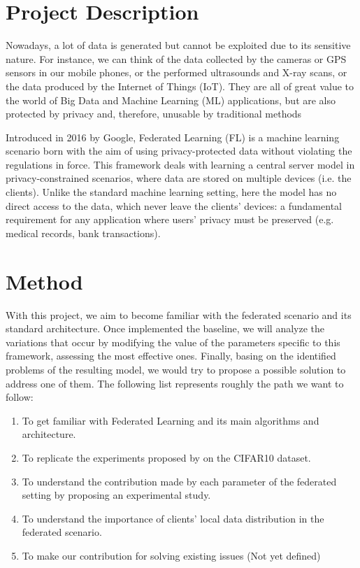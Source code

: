 \documentclass{article}
\begin{document}
	
	
\section{Project Description}

Nowadays, a lot of data is generated but cannot be exploited due to its sensitive nature. For
instance, we can think of the data collected by the cameras or GPS sensors in our mobile phones,
or the performed ultrasounds and X-ray scans, or the data produced by the Internet of Things
(IoT). They are all of great value to the world of Big Data and Machine Learning (ML) applications,
but are also protected by privacy and, therefore, unusable by traditional methods


Introduced in 2016 by Google, Federated Learning (FL) is a machine learning scenario born with
the aim of using privacy-protected data without violating the regulations in force. This framework
deals with learning a central server model in privacy-constrained scenarios, where data are
stored on multiple devices (i.e. the clients). Unlike the standard machine learning setting, here the
model has no direct access to the data, which never leave the clients’ devices: a fundamental
requirement for any application where users’ privacy must be preserved (e.g. medical records,
bank transactions).



\section{Method}
With this project, we aim to become familiar with the federated scenario and its standard architecture. Once implemented the baseline, we will analyze the variations that occur by modifying the value of the parameters specific to this framework, assessing the most effective ones. Finally, basing on the identified problems of the resulting model, we would try to propose a possible solution to address one of them. The following list represents roughly the path we want to follow:

\begin{enumerate}
    \item To get familiar with Federated Learning and its main algorithms and architecture.
    \item  To replicate the experiments proposed by \cite{DBLP:journals/corr/abs-2003-08082} on the CIFAR10 dataset.
    \item To understand the contribution made by each parameter of the federated setting by
proposing an experimental study.
\item To understand the importance of clients’ local data distribution in the federated scenario. 
\item To make our contribution for solving existing issues (Not yet defined)\\
\end{enumerate}
\end{document}
